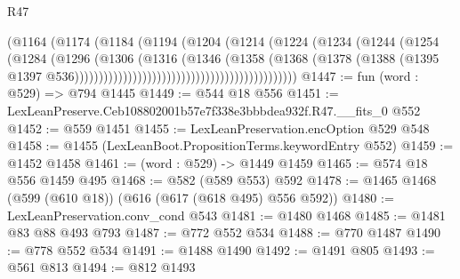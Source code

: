 \begin{lexlean}{R47}
\begin{coremodule}
                                                        (@1164
                                                          (@1174
                                                            (@1184
                                                              (@1194
                                                                (@1204
                                                                  (@1214
                                                                    (@1224
                                                                      (@1234
                                                                        (@1244
                                                                          (@1254
                                                                            (@1284
                                                                              (@1296
                                                                                (@1306
                                                                                  (@1316
                                                                                    (@1346
                                                                                      (@1358
                                                                                        (@1368
                                                                                          (@1378
                                                                                            (@1388
                                                                                              (@1395
                                                                                                @1397
                                                                                                @536))))))))))))))))))))))))))))))))))))))))))))))
@1447 := fun (word : @529) => @794 @1445
@1449 := @544 @18 @556
@1451 := LexLeanPreserve.Ceb108802001b57e7f338e3bbbdea932f.R47.__fits_0 @552
@1452 := @559 @1451
@1455 := LexLeanPreservation.encOption @529 @548
@1458 := @1455 (LexLeanBoot.PropositionTerms.keywordEntry @552)
@1459 := @1452 @1458
@1461 := (word : @529) -> @1449 @1459
@1465 := @574 @18 @556 @1459 @495
@1468 := @582 (@589 @553) @592
@1478 := @1465 @1468 (@599 (@610 @18)) (@616 (@617 (@618 @495) @556 @592))
@1480 := LexLeanPreservation.conv_cond @543
@1481 := @1480 @1468
@1485 := @1481 @83 @88 @493 @793
@1487 := @772 @552 @534
@1488 := @770 @1487
@1490 := @778 @552 @534
@1491 := @1488 @1490
@1492 := @1491 @805
@1493 := @561 @813
@1494 := @812 @1493

\end{coremodule}
\end{lexlean}
